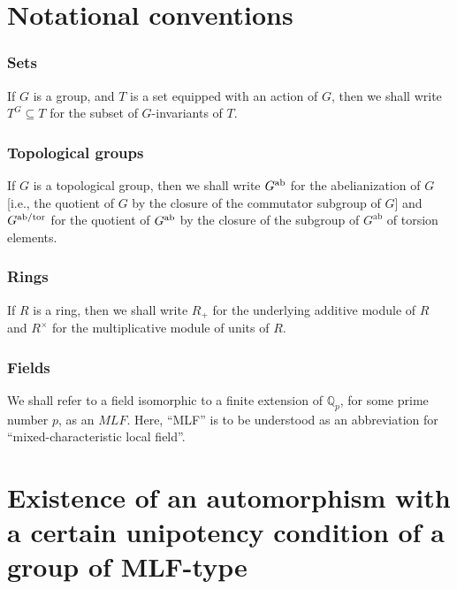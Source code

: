 \documentclass[12pt,showkeys]{amsart}
\theoremstyle{theorem}
\theoremstyle{definition}
\def\Qp{{{\mathbb Q}_p}}
\begin{document}
\section{Notational conventions}\label{section0}

\subsubsection*{\sc Sets} 
 
If $G$ is a group, and $T$ is a set equipped with an action of $G$, then we shall write $T^G \subseteq T$ for the subset of $G$-invariants of $T$.

\subsubsection*{\sc Topological groups} 
 
If $G$ is a topological group, then we shall write $G^{\rm ab}$ for the abelianization of $G$ [i.e., the quotient of $G$ by the closure of the commutator subgroup
of $G$] and $G^{\rm ab/tor}$ for the quotient of $G^{\rm ab}$ by the closure of the subgroup of $G^{\mathrm{ab}}$ of torsion elements. 

\subsubsection*{\sc Rings}
 
If $R$ is a ring, then we shall write $R_+$ for the underlying additive module of $R$ and $R^\times$ for the multiplicative module of units of $R$.  

\subsubsection*{\sc Fields} 
 
We shall refer to a field isomorphic to a finite extension of $\Qp$, for some prime number $p$, as an $MLF$. Here, ``MLF'' is to be understood as an abbreviation for ``mixed-characteristic local field''. 

\section{Existence of an automorphism with a certain unipotency condition of a group of MLF-type}\label{section1}
\end{document}
